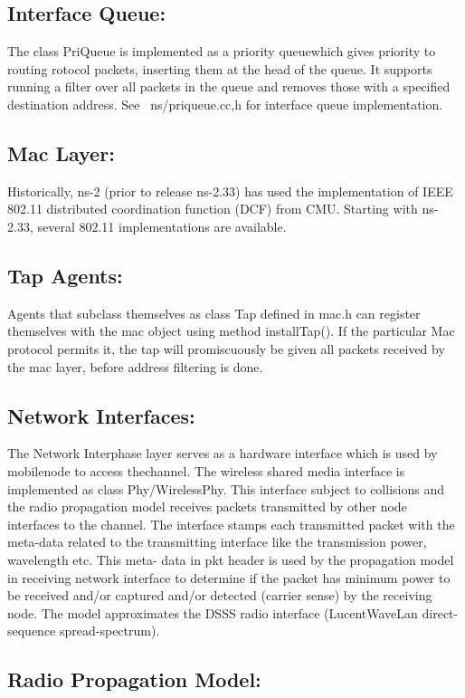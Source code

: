 \documentclass[11pt]{article}
\begin{document}
\subsection{Interface Queue: }


The class PriQueue is implemented as a priority queuewhich gives priority to routing
rotocol packets, inserting them at the head of the queue. It supports running a filter over all packets in the
queue and removes those with a specified destination address. See ~ns/priqueue.{cc,h} for interface
queue implementation.
\subsection{Mac Layer: }


Historically, ns-2 (prior to release ns-2.33) has used the implementation of IEEE 802.11
distributed coordination function (DCF) from CMU. Starting with ns-2.33, several 802.11
implementations are available.
\subsection{Tap Agents: }


Agents that subclass themselves as class Tap defined in mac.h can register themselves with
the mac object using method installTap(). If the particular Mac protocol permits it, the tap will
promiscuously be given all packets received by the mac layer, before address filtering is done.
\subsection{Network Interfaces: }


The Network Interphase layer serves as a hardware interface which is used by
mobilenode to access thechannel. The wireless shared media interface is implemented as class
Phy/WirelessPhy. This interface subject to collisions and the radio propagation model receives packets
transmitted by other node interfaces to the channel. The interface stamps each transmitted packet with the
meta-data related to the transmitting interface like the transmission power, wavelength etc. This meta-
data in pkt header is used by the propagation model in receiving network interface to determine if the
packet has minimum power to be received and/or captured and/or detected (carrier sense) by the
receiving node. The model approximates the DSSS radio interface (LucentWaveLan direct-sequence
spread-spectrum).
\subsection{Radio Propagation Model: }
\end{document}

